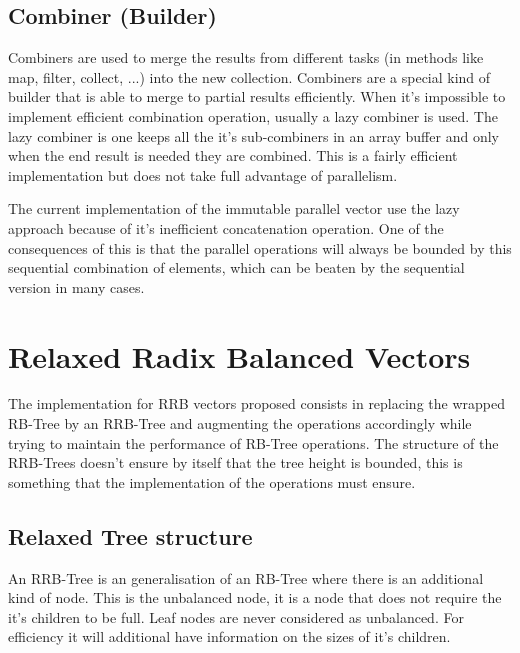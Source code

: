 
\subsection{Combiner (Builder)}
Combiners are used to merge the results from different tasks (in methods like map, filter, collect, ...) into the new collection. Combiners are a special kind of builder that is able to merge to partial results efficiently. When it's impossible to implement efficient combination operation, usually a lazy combiner is used. The lazy combiner is one keeps all the it's sub-combiners in an array buffer and only when the end result is needed they are combined. This is a fairly efficient implementation but does not take full advantage of parallelism. 

The current implementation of the immutable parallel vector \cite{scalaParVector211} use the lazy approach because of it's inefficient concatenation operation. One of the consequences of this is that the parallel operations will always be bounded by this sequential combination of elements, which can be beaten by the sequential version in many cases.
 

\clearpage
\section{Relaxed Radix Balanced Vectors}

The implementation for RRB vectors proposed consists in replacing the wrapped RB-Tree by an RRB-Tree and augmenting the operations accordingly while trying to maintain the performance of RB-Tree operations. The structure of the RRB-Trees doesn't ensure by itself that the tree height is bounded, this is something that the implementation of the operations must ensure. 


\subsection{Relaxed Tree structure}
An RRB-Tree is an generalisation of an RB-Tree where there is an additional kind of node. This is the unbalanced node, it is a node that does not require the it's children to be full. Leaf nodes are never considered as unbalanced. For efficiency it will additional have information on the sizes of it's children.

